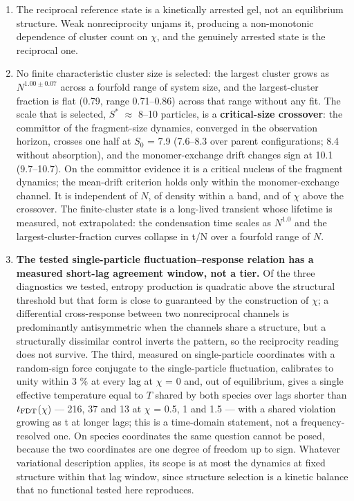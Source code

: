 \documentclass[aps,pre,preprint,superscriptaddress,nofootinbib,longbibliography]{revtex4-2}
\begin{document}
\begin{enumerate}
\item The reciprocal reference state is a kinetically arrested gel, not an equilibrium structure. Weak nonreciprocity unjams it, producing a non-monotonic dependence of cluster count on $\chi$, and the genuinely arrested state is the reciprocal one.
\item No finite characteristic cluster size is selected: the largest cluster grows as $N^{1.00\pm0.07}$ across a fourfold range of system size, and the largest-cluster fraction is flat (0.79, range 0.71--0.86) across that range without any fit. The scale that is selected, $S^*$ $\approx$ 8--10 particles, is a \textbf{critical-size crossover}: the committor of the fragment-size dynamics, converged in the observation horizon, crosses one half at $S_0$ = 7.9 (7.6--8.3 over parent configurations; 8.4 without absorption), and the monomer-exchange drift changes sign at 10.1 (9.7--10.7). On the committor evidence it is a critical nucleus of the fragment dynamics; the mean-drift criterion holds only within the monomer-exchange channel. It is independent of $N$, of density within a band, and of $\chi$ above the crossover. The finite-cluster state is a long-lived transient whose lifetime is measured, not extrapolated: the condensation time scales as $N^{1.0}$ and the largest-cluster-fraction curves collapse in t/N over a fourfold range of $N$.
\item \textbf{The tested single-particle fluctuation--response relation has a measured short-lag agreement window, not a tier.} Of the three diagnostics we tested, entropy production is quadratic above the structural threshold but that form is close to guaranteed by the construction of $\chi$; a differential cross-response between two nonreciprocal channels is predominantly antisymmetric when the channels share a structure, but a structurally dissimilar control inverts the pattern, so the reciprocity reading does not survive. The third, measured on single-particle coordinates with a random-sign force conjugate to the single-particle fluctuation, calibrates to unity within 3 \% at every lag at $\chi$ = 0 and, out of equilibrium, gives a single effective temperature equal to $T$ shared by both species over lags shorter than $t_{\rm FDT}$($\chi$) --- 216, 37 and 13 at $\chi$ = 0.5, 1 and 1.5 --- with a shared violation growing as t at longer lags; this is a time-domain statement, not a frequency-resolved one. On species coordinates the same question cannot be posed, because the two coordinates are one degree of freedom up to sign. Whatever variational description applies, its scope is at most the dynamics at fixed structure within that lag window, since structure selection is a kinetic balance that no functional tested here reproduces.

\end{enumerate}
\end{document}
